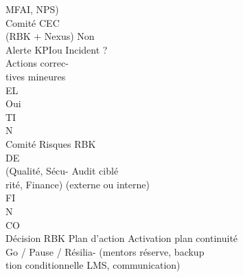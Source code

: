 MFAI, NPS)\\
\vspace{0.5em}
\vspace{0.5em}
\vspace{0.5em}
\vspace{0.5em}
Comité CEC\\
(RBK + Nexus)                           Non\\
Alerte KPIou Incident ?\\
Actions correc-\\
tives mineures\\
\vspace{0.5em}
\vspace{0.5em}
\vspace{0.5em}
\vspace{0.5em}
EL\\
Oui\\
\vspace{0.5em}
\vspace{0.5em}
\vspace{0.5em}
\vspace{0.5em}
TI\\
N\\
Comité Risques RBK\\
\vspace{0.5em}
\vspace{0.5em}
\vspace{0.5em}
\vspace{0.5em}
DE\\
(Qualité, Sécu-                                                    Audit ciblé\\
rité, Finance)                                                         (externe ou interne)\\
\vspace{0.5em}
\vspace{0.5em}
\vspace{0.5em}
\vspace{0.5em}
FI\\
N\\
CO\\
\vspace{0.5em}
Décision RBK                                              Plan d’action     Activation plan continuité\\
Go / Pause / Résilia-                                                    (mentors réserve, backup\\
tion conditionnelle                                                        LMS, communication)\\

